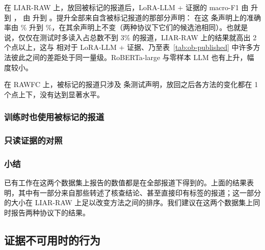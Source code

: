 在 LIAR-RAW 上，放回被标记的报道后，LoRA-LLM + 证据的 macro-F1 由  升到 ，\ours{} 由  升到 。提升全部来自含被标记报道的那部分声明：\ours{} 在这  条声明上的准确率由 \% 升到 \%，在其余声明上不变（两种协议下它们的候选池相同）。也就是说，仅仅在测试时多读入占总数不到 3\% 的报道，LIAR-RAW 上的结果就高出 2 个点以上，这与 \ours{} 相对于 LoRA-LLM + 证据、乃至表~\ref{tab:ob-published} 中许多方法彼此之间的差距处于同一量级。RoBERTa-large 与零样本 LLM 也有上升，幅度较小。

在 RAWFC 上，被标记的报道只涉及  条测试声明，放回之后各方法的变化都在 1 个点上下，没有达到显著水平。

\subsubsection{训练时也使用被标记的报道}

\begin{table}[htbp]
\centering\small
\caption{\ours{} 在两种协议下训练与测试的结果（macro-F1，\%）}\label{tab:ob-cross}
\end{table}

\subsubsection{只读证据的对照}

\subsubsection{小结}
已有工作在这两个数据集上报告的数值都是在全部报道下得到的。上面的结果表明，其中有一部分来自那些转述了核查结论、甚至直接印有标签的报道；这一部分的大小在 LIAR-RAW 上足以改变方法之间的排序。我们建议在这两个数据集上同时报告两种协议下的结果。

\subsection{证据不可用时的行为}\label{sec:ob-robust}

